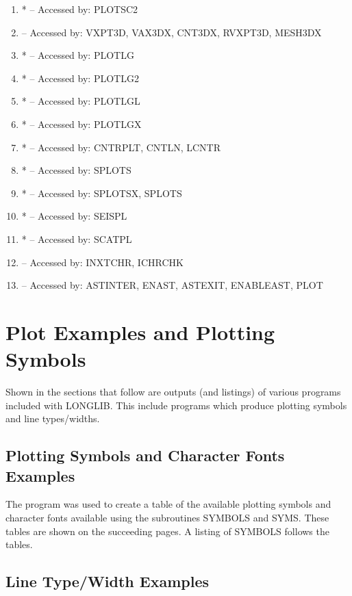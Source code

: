 \documentclass[11pt]{report}
\begin{document}
\begin{enumerate}
\item {} * -- Accessed by: PLOTSC2
\item {} -- Accessed by: VXPT3D, VAX3DX, CNT3DX, RVXPT3D, MESH3DX
\item {} * -- Accessed by: PLOTLG
\item {} * -- Accessed by: PLOTLG2
\item {} * -- Accessed by: PLOTLGL
\item {} * -- Accessed by: PLOTLGX
\item {} * -- Accessed by: CNTRPLT, CNTLN, LCNTR
\item {} * -- Accessed by: SPLOTS
\item {} * -- Accessed by: SPLOTSX, SPLOTS
\item {} * -- Accessed by: SEISPL
\item {} * -- Accessed by: SCATPL
\item {} -- Accessed by: INXTCHR, ICHRCHK
\item {} -- Accessed by: ASTINTER, ENAST, ASTEXIT, ENABLEAST, PLOT
\end{enumerate}

\chapter{Plot Examples and Plotting Symbols}

Shown in the sections that follow are outputs (and listings) of various
programs included with LONGLIB.  This include programs which produce
plotting symbols and line types/widths.

\section{Plotting Symbols and Character Fonts Examples}

The program  was used to create a table of the 
available plotting symbols and character fonts available using the
subroutines SYMBOLS and SYMS.  These tables are shown on the
succeeding pages.  A listing of SYMBOLS follows the tables.

\newpage
\section{Line Type/Width Examples}
\end{document}

